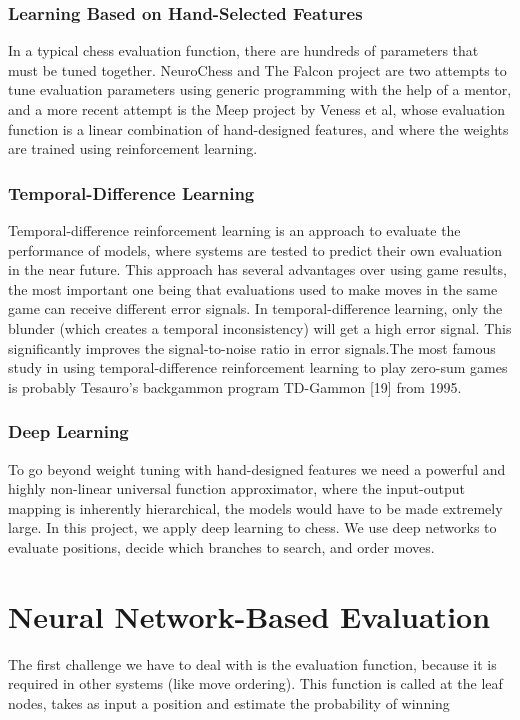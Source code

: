 \documentclass[12pt, a4paper]{report}
\begin{document}
			\subsection{Learning Based on Hand-Selected Features}
			In a typical chess evaluation function, there are hundreds of parameters that must be tuned together. NeuroChess and The Falcon project are two attempts to tune evaluation parameters using generic programming with the help of a mentor, and a more recent attempt is the Meep project by Veness et al, whose evaluation function is a linear combination of hand-designed features, and where the weights are trained using reinforcement learning.
			\subsection{Temporal-Difference Learning}
			Temporal-difference reinforcement learning is an approach to evaluate the performance of models, where systems are  tested to predict their own evaluation in the near future.
			This approach has several advantages over using game results, the most important one being that evaluations used to make moves in the same game can receive different error signals.
			In temporal-difference learning, only the blunder (which creates a temporal inconsistency) will get a high error signal. This significantly improves the signal-to-noise ratio in error signals.The most famous study in using temporal-difference reinforcement learning to play zero-sum games is probably Tesauro's backgammon program TD-Gammon [19] from 1995.
			\subsection{Deep Learning}
			To go beyond weight tuning with hand-designed features we need a powerful and highly non-linear universal function approximator, where the input-output mapping is inherently hierarchical, the models would have to be made extremely large.
			In this project, we apply deep learning to chess. We use deep networks to evaluate positions, decide which branches to search, and order moves.
	
	\chapter{Neural Network-Based Evaluation}
			The first challenge we have to deal with is the evaluation function, because it is required in other systems (like move ordering). This function is called at the leaf nodes, takes as input a position and estimate the probability of winning
\end{document}
